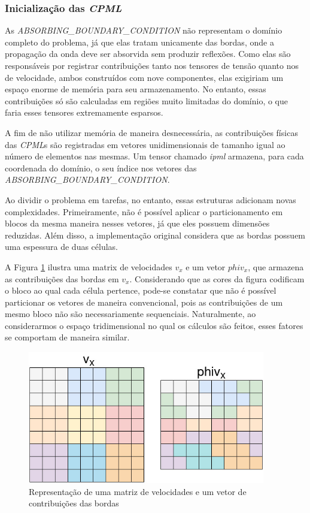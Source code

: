 \documentclass[cic,tc]{iiufrgs}
\begin{document}
\subsubsection{Inicialização das \textit{CPML}}

As \textit{ABSORBING\_BOUNDARY\_CONDITION} não representam o domínio completo do
problema, já que elas tratam unicamente das bordas, onde a propagação da onda deve ser absorvida sem produzir reflexões. Como elas são
responsáveis por registrar contribuições tanto nos tensores de tensão quanto nos de velocidade, ambos construídos com nove componentes,
elas exigiriam um espaço enorme de memória para seu armazenamento. No entanto, essas contribuições só são calculadas em regiões muito
limitadas do domínio, o que faria esses tensores extremamente esparsos. 

A fim de não utilizar memória de maneira desnecessária, as contribuições físicas das \textit{CPML}s são registradas em vetores
unidimensionais de tamanho igual ao número de elementos nas mesmas. Um tensor chamado \textit{ipml} armazena, para cada coordenada
do domínio, o seu índice nos vetores das \textit{ABSORBING\_BOUNDARY\_CONDITION}.

Ao dividir o problema em tarefas, no entanto, essas estruturas adicionam novas complexidades. Primeiramente, não é possível aplicar
o particionamento em blocos da mesma maneira nesses vetores, já que eles possuem dimensões reduzidas. Além disso, a implementação
original considera que as bordas possuem uma espessura de duas células.

A Figura \ref{fig:ipml} ilustra uma matrix de velocidades $v_x$ e um vetor $phiv_x$,
que armazena as contribuições das bordas em $v_x$. Considerando que as cores da figura codificam o bloco ao qual cada célula
pertence, pode-se constatar que não é possível particionar os vetores de maneira convencional, pois as contribuições de um
mesmo bloco não são necessariamente sequenciais. Naturalmente, ao considerarmos o espaço tridimensional no qual os cálculos são feitos,
esses fatores se comportam de maneira similar.

\begin{figure}[!htb]
    \caption{Representação de uma matriz de velocidades e um vetor de contribuições das bordas}
    \begin{center}
      \includegraphics[width=28em]{ipml}
    \end{center}
    \label{fig:ipml}
\end{figure}
\end{document}
